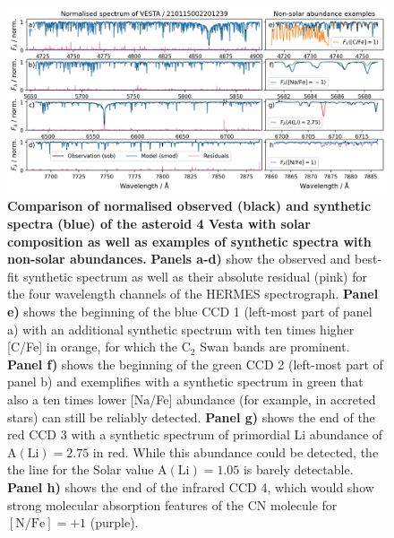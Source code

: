 \documentclass[
  journal=pasa,
  manuscript=research-paper, %
  year=2023,
  volume=37
]{cup-journal}
\begin{document}
\begin{figure}[ht]
 \centering
 \includegraphics[width=\textwidth]{figures/210115002201239_abundance_examples.png}
 \caption{\textbf{Comparison of normalised observed (black) and synthetic spectra (blue) of the asteroid 4 Vesta with solar composition as well as examples of synthetic spectra with non-solar abundances.}
 \textbf{Panels a-d)} show the observed and best-fit synthetic spectrum as well as their absolute residual (pink) for the four wavelength channels of the HERMES spectrograph.
 \textbf{Panel e)} shows the beginning of the blue CCD 1 (left-most part of panel a) with an additional synthetic spectrum with ten times higher [C/Fe] in orange, for which the $\mathrm{C}_2$  Swan bands are prominent.
 \textbf{Panel f)} shows the beginning of the green CCD 2 (left-most part of panel b) and exemplifies with a synthetic spectrum in green that also a ten times lower [Na/Fe] abundance (for example, in accreted stars) can still be reliably detected. 
 \textbf{Panel g)} shows the end of the red CCD 3 with a synthetic spectrum of primordial Li abundance of $\mathrm{A(Li)} = 2.75$ in red. While this abundance could be detected, the the line for the Solar value $\mathrm{A(Li)} = 1.05$ is barely detectable.
 \textbf{Panel h)} shows the end of the infrared CCD 4, which would show strong molecular absorption features of the CN molecule for $\mathrm{[N/Fe]} = +1$ (purple).
 }
 \label{fig:210115002201239_abundance_examples}
\end{figure}
\end{document}
